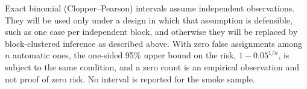 Exact binomial (Clopper--Pearson) intervals assume independent observations. They will be used only under a design in which that assumption is defensible, such as one case per independent block, and otherwise they will be replaced by block-clustered inference as described above. With zero false assignments among $n$ automatic ones, the one-sided 95\% upper bound on the risk, $1-0.05^{1/n}$, is subject to the same condition, and a zero count is an empirical observation and not proof of zero risk. No interval is reported for the smoke sample.
